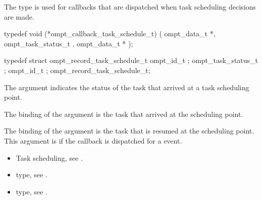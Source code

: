\label{sec:ompt_callback_task_schedule_t}

\summary
The  type is used for callbacks that are 
dispatched when task scheduling decisions are made.

\format
\begin{ccppspecific}
\begin{omptCallback}
typedef void (*ompt_callback_task_schedule_t) (
  ompt_data_t *,
  ompt_task_status_t ,
  ompt_data_t *
);
\end{omptCallback}
\end{ccppspecific}

\record
\begin{ccppspecific}
\begin{omptRecord}
typedef struct ompt_record_task_schedule_t {
  ompt_id_t ;
  ompt_task_status_t ;
  ompt_id_t ;
} ompt_record_task_schedule_t;
\end{omptRecord}
\end{ccppspecific}

\argdesc
The  argument indicates the status of
the task that arrived at a task scheduling point.

The binding of the  argument is the task that
arrived at the scheduling point.

The binding of the  argument is the task that
is resumed at the scheduling point. This argument is  if 
the callback is dispatched for a  event.

\crossreferences
\begin{itemize}
\item Task scheduling, see .

\item {} type, see .

\item {} type, see .
\end{itemize}



\label{sec:ompt_callback_implicit_task_t}

